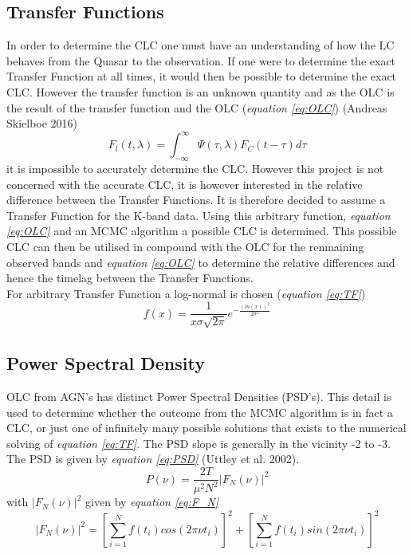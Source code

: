 \documentclass[11pt]{article}
\begin{document}
\subsection{Transfer Functions}
In order to determine the CLC one must have an understanding of how the LC behaves from the Quasar to the observation. If one were to determine the exact Transfer Function at all times, it would then be possible to determine the exact CLC. However the transfer function is an unknown quantity and as the OLC is the result of the transfer function and the OLC (\emph{equation \ref{eq:OLC}}) (Andreas Skielboe 2016)
\begin{equation}
F_l(t,\lambda) = \int_{-\infty}^{\infty}\Psi(\tau,\lambda)F_C(t-\tau)d\tau
\label{eq:OLC}
\end{equation}
it is impossible to accurately determine the CLC. However this project is not concerned with the accurate CLC, it is however interested in the relative difference between the Transfer Functions. It is therefore decided to assume a Transfer Function for the K-band data. Using this arbitrary function, \emph{equation \ref{eq:OLC}} and an MCMC algorithm a possible CLC is determined. This possible CLC can then be utilised in compound with the OLC for the renmaining observed bands and \emph{equation \ref{eq:OLC}} to determine the relative differences and hence the timelag between the Transfer Functions. \\
For arbitrary Transfer Function a log-normal is chosen (\emph{equation \ref{eq:TF}})
\begin{equation}
f(x) = \frac{1}{x\sigma\sqrt{2\pi}}e^{-\frac{(ln(x))^2}{2\sigma^2}}
\label{eq:TF}
\end{equation}

\subsection{Power Spectral Density}
OLC from AGN's has distinct Power Spectral Densities (PSD's). This detail is used to determine whether the outcome from the MCMC algorithm is in fact a CLC, or just one of infinitely many possible solutions that exists to the numerical solving of \emph{equation \ref{eq:TF}}. The PSD slope is generally in the vicinity -2 to -3. The PSD is given by \emph{equation \ref{eq:PSD}} (Uttley et al. 2002).
\begin{equation}
P(\nu) = \frac{2T}{\mu^2N^2}|F_N(\nu)|^2
\label{eq:PSD}
\end{equation}
with $|F_N(\nu)|^2$ given by \emph{equation \ref{eq:F_N}}
\begin{equation}
|F_N(\nu)|^2 = [\sum_{i=1}^{N}f(t_i)cos(2\pi\nu t_i)]^2 + [\sum_{i=1}^{N}f(t_i)sin(2\pi\nu t_i)]^2
\label{eq:F_N}
\end{equation}
\end{document}
